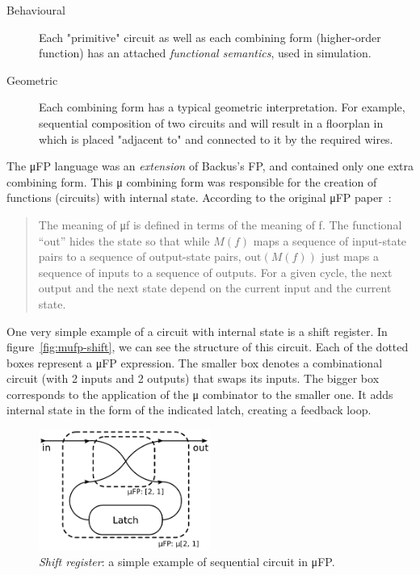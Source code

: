         \begin{description}
            \item[Behavioural]
                Each "primitive" circuit as well as each combining form (higher-order function)
                has an attached \emph{functional semantics}, used in simulation.
            \item[Geometric]
                Each combining form has a typical geometric interpretation.
                For example, sequential composition of two circuits  and  will result
                in a floorplan in which  is placed "adjacent to"  and connected to it
                by the required wires.
        \end{description}

        The μFP language was an \emph{extension} of Backus's FP, and contained only one extra combining form.
        This μ combining form was responsible for the creation of functions (circuits) with internal state.
        According to the original μFP paper~\cite{mufp-1984}:

        \begin{quote}
            The meaning of μf is defined in terms of the meaning of f.
            The functional ``out'' hides the state
            so that while $M(f)$ maps a sequence of input-state pairs to a sequence of output-state pairs,
            $\text{out}(M(f))$ just maps a sequence of inputs to a sequence of outputs.
            For a given cycle, the next output and the next state depend on the current input and the current state.
        \end{quote}

        One very simple example of a circuit with internal state is a shift register.
        In figure~\ref{fig:mufp-shift}, we can see the structure of this circuit.
        Each of the dotted boxes represent a μFP expression.
        The smaller box denotes a combinational circuit (with 2 inputs and 2 outputs) that swaps its inputs.
        The bigger box corresponds to the application of the μ combinator to the smaller one.
        It adds internal state in the form of the indicated latch, creating a feedback loop.

        \begin{figure}[h]
            \centerline{\includegraphics[width=0.5\textwidth]{imgs/mufp-shift.pdf}}
            \caption{\emph{Shift register}: a simple example of sequential circuit in μFP. \label{mufp-shift}}
        \end{figure}

